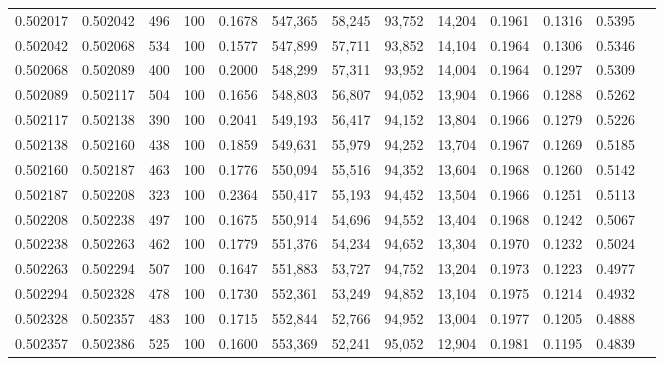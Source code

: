 \begin{tabular}{rrrrrrrrrrrrr}
0.502017 & 0.502042 &   496 & 100 &                                     0.1678 & 547,365 &  58,245 &  93,752 &  14,204 & 0.1961 & 0.1316 & 0.5395 \\
0.502042 & 0.502068 &   534 & 100 &                                     0.1577 & 547,899 &  57,711 &  93,852 &  14,104 & 0.1964 & 0.1306 & 0.5346 \\
0.502068 & 0.502089 &   400 & 100 &                                     0.2000 & 548,299 &  57,311 &  93,952 &  14,004 & 0.1964 & 0.1297 & 0.5309 \\
0.502089 & 0.502117 &   504 & 100 &                                     0.1656 & 548,803 &  56,807 &  94,052 &  13,904 & 0.1966 & 0.1288 & 0.5262 \\
0.502117 & 0.502138 &   390 & 100 &                                     0.2041 & 549,193 &  56,417 &  94,152 &  13,804 & 0.1966 & 0.1279 & 0.5226 \\
0.502138 & 0.502160 &   438 & 100 &                                     0.1859 & 549,631 &  55,979 &  94,252 &  13,704 & 0.1967 & 0.1269 & 0.5185 \\
0.502160 & 0.502187 &   463 & 100 &                                     0.1776 & 550,094 &  55,516 &  94,352 &  13,604 & 0.1968 & 0.1260 & 0.5142 \\
0.502187 & 0.502208 &   323 & 100 &                                     0.2364 & 550,417 &  55,193 &  94,452 &  13,504 & 0.1966 & 0.1251 & 0.5113 \\
0.502208 & 0.502238 &   497 & 100 &                                     0.1675 & 550,914 &  54,696 &  94,552 &  13,404 & 0.1968 & 0.1242 & 0.5067 \\
0.502238 & 0.502263 &   462 & 100 &                                     0.1779 & 551,376 &  54,234 &  94,652 &  13,304 & 0.1970 & 0.1232 & 0.5024 \\
0.502263 & 0.502294 &   507 & 100 &                                     0.1647 & 551,883 &  53,727 &  94,752 &  13,204 & 0.1973 & 0.1223 & 0.4977 \\
0.502294 & 0.502328 &   478 & 100 &                                     0.1730 & 552,361 &  53,249 &  94,852 &  13,104 & 0.1975 & 0.1214 & 0.4932 \\
0.502328 & 0.502357 &   483 & 100 &                                     0.1715 & 552,844 &  52,766 &  94,952 &  13,004 & 0.1977 & 0.1205 & 0.4888 \\
0.502357 & 0.502386 &   525 & 100 &                                     0.1600 & 553,369 &  52,241 &  95,052 &  12,904 & 0.1981 & 0.1195 & 0.4839 \\

\end{tabular}
